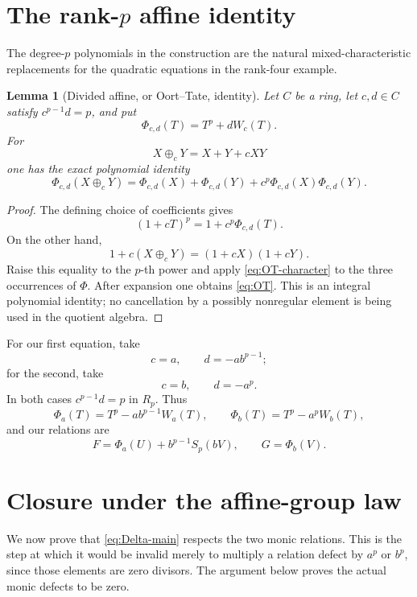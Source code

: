 \documentclass[11pt]{amsart}
\newtheorem{lemma}[theorem]{Lemma}
\theoremstyle{definition}
\theoremstyle{remark}
\begin{document}
\section{The rank-\texorpdfstring{\(p\)}{p} affine identity}

The degree-\(p\) polynomials in the construction are the natural
mixed-characteristic replacements for the quadratic equations in the
rank-four example.

\begin{lemma}[Divided affine, or Oort--Tate, identity]
\label{lem:OT}
Let \(C\) be a ring, let \(c,d\in C\) satisfy
\(c^{p-1}d=p\), and put
\[
 \Phi_{c,d}(T)=T^p+dW_c(T).
\]
For
\[
 X\oplus_cY=X+Y+cXY
\]
one has the exact polynomial identity
\begin{equation}\label{eq:OT}
 \Phi_{c,d}(X\oplus_cY)
 =\Phi_{c,d}(X)+\Phi_{c,d}(Y)
  +c^p\Phi_{c,d}(X)\Phi_{c,d}(Y).
\end{equation}
\end{lemma}

\begin{proof}
The defining choice of coefficients gives
\begin{equation}\label{eq:OT-character}
 (1+cT)^p=1+c^p\Phi_{c,d}(T).
\end{equation}
On the other hand,
\[
 1+c(X\oplus_cY)=(1+cX)(1+cY).
\]
Raise this equality to the \(p\)-th power and apply
\eqref{eq:OT-character} to the three occurrences of \(\Phi\).  After
expansion one obtains \eqref{eq:OT}.  This is an integral polynomial
identity; no cancellation by a possibly nonregular element is being
used in the quotient algebra.
\end{proof}

For our first equation, take
\[
 c=a,\qquad d=-ab^{p-1};
\]
for the second, take
\[
 c=b,\qquad d=-a^p.
\]
In both cases \(c^{p-1}d=p\) in \(R_p\).  Thus
\begin{equation}\label{eq:Phiab}
 \Phi_a(T)=T^p-ab^{p-1}W_a(T),
 \qquad
 \Phi_b(T)=T^p-a^pW_b(T),
\end{equation}
and our relations are
\begin{equation}\label{eq:F-Phi}
 F=\Phi_a(U)+b^{p-1}S_p(bV),
 \qquad G=\Phi_b(V).
\end{equation}

\section{Closure under the affine-group law}\label{sec:closure}

We now prove that \eqref{eq:Delta-main} respects the two monic
relations.  This is the step at which it would be invalid merely to
multiply a relation defect by \(a^p\) or \(b^p\), since those elements
are zero divisors.  The argument below proves the actual monic defects
to be zero.
\end{document}
